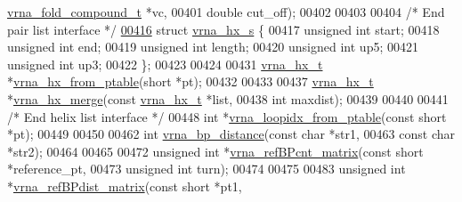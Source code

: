 \begin{DoxyCode}
      \hyperlink{group__fold__compound_structvrna__fc__s}{vrna\_fold\_compound\_t} *vc,
00401                                  \textcolor{keywordtype}{double}               cut\_off);
00402 
00403 
00404 \textcolor{comment}{/* End pair list interface */}
\hyperlink{group__struct__utils__helix__list}{00416} \textcolor{keyword}{struct }\hyperlink{group__struct__utils__helix__list_structvrna__hx__s}{vrna\_hx\_s} \{
00417   \textcolor{keywordtype}{unsigned} \textcolor{keywordtype}{int}  start;
00418   \textcolor{keywordtype}{unsigned} \textcolor{keywordtype}{int}  end;
00419   \textcolor{keywordtype}{unsigned} \textcolor{keywordtype}{int}  length;
00420   \textcolor{keywordtype}{unsigned} \textcolor{keywordtype}{int}  up5;
00421   \textcolor{keywordtype}{unsigned} \textcolor{keywordtype}{int}  up3;
00422 \};
00423 
00424 
00431 \hyperlink{group__struct__utils__helix__list_structvrna__hx__s}{vrna\_hx\_t} *\hyperlink{group__struct__utils__helix__list_ga7ca60670fbbf23ae2ac9f63e5dbf8aef}{vrna\_hx\_from\_ptable}(\textcolor{keywordtype}{short} *pt);
00432 
00433 
00437 \hyperlink{group__struct__utils__helix__list_structvrna__hx__s}{vrna\_hx\_t} *\hyperlink{group__struct__utils__helix__list_ga2fdaac8bb6c239c119ad5c20b145b7f2}{vrna\_hx\_merge}(\textcolor{keyword}{const} \hyperlink{group__struct__utils__helix__list_structvrna__hx__s}{vrna\_hx\_t}  *list,
00438                          \textcolor{keywordtype}{int}              maxdist);
00439 
00440 
00441 \textcolor{comment}{/* End helix list interface */}
00448 \textcolor{keywordtype}{int} *\hyperlink{group__struct__utils_ga03e15af299be0866ff21da880c74b92e}{vrna\_loopidx\_from\_ptable}(\textcolor{keyword}{const} \textcolor{keywordtype}{short} *pt);
00449 
00450 
00462 \textcolor{keywordtype}{int} \hyperlink{group__struct__utils_ga65bdfbac6a16bf30286e8a3f7d15f60a}{vrna\_bp\_distance}(\textcolor{keyword}{const} \textcolor{keywordtype}{char} *str1,
00463                      \textcolor{keyword}{const} \textcolor{keywordtype}{char} *str2);
00464 
00465 
00472 \textcolor{keywordtype}{unsigned} \textcolor{keywordtype}{int} *\hyperlink{group__struct__utils_gab4c2a00c99ce1d612ffa5bde114eb96d}{vrna\_refBPcnt\_matrix}(\textcolor{keyword}{const} \textcolor{keywordtype}{short}  *reference\_pt,
00473                                    \textcolor{keywordtype}{unsigned} \textcolor{keywordtype}{int} turn);
00474 
00475 
00483 \textcolor{keywordtype}{unsigned} \textcolor{keywordtype}{int} *\hyperlink{group__struct__utils_ga5a27bd058183170afd4716f5b8ff511a}{vrna\_refBPdist\_matrix}(\textcolor{keyword}{const} \textcolor{keywordtype}{short}   *pt1,

\end{DoxyCode}
